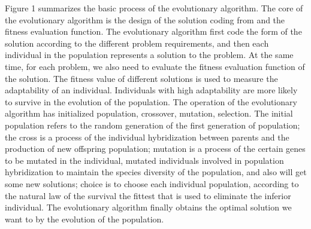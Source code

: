 Figure 1 summarizes the basic process of the evolutionary algorithm. The core 
of the evolutionary algorithm is the design of the solution coding from and 
the fitness evaluation function. The evolutionary algorithm first code the 
form of the solution according to the different problem requirements, and 
then each individual in the population represents a solution to the problem. 
At the same time, for each problem, we also need to evaluate the fitness 
evaluation function of the solution. The fitness value of different solutions 
is used to measure the adaptability of an individual. Individuals with high 
adaptability are more likely to survive in the evolution of the population. 
The operation of the evolutionary algorithm has initialized population, 
crossover, mutation, selection. The initial population refers to the random 
generation of the first generation of population; the cross is a process of 
the individual hybridization between parents and the production of new 
offspring population; mutation is a process of the certain genes to be 
mutated in the individual, mutated individuals involved in population 
hybridization to maintain the species diversity of the population, and also 
will get some new solutions; choice is to choose each individual population, 
according to the natural law of the survival the fittest that is used to 
eliminate the inferior individual. The evolutionary algorithm finally obtains 
the optimal solution we want to by the evolution of the population.


